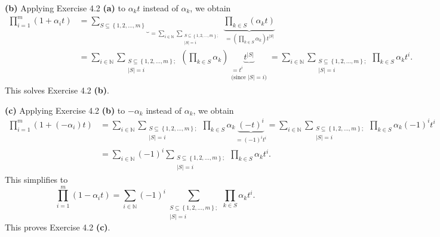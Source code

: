 \documentclass[numbers=enddot,12pt,final,onecolumn,notitlepage]{scrartcl}%
\begin{document}
\textbf{(b)} Applying Exercise 4.2 \textbf{(a)} to $\alpha_{k}t$ instead of
$\alpha_{k}$, we obtain%
\begin{align*}
\prod\limits_{i=1}^{m}\left(  1+\alpha_{i}t\right)   &  =\underbrace{\sum
\limits_{S\subseteq\left\{  1,2,...,m\right\}  }}_{=\sum\limits_{i\in
\mathbb{N}}\sum\limits_{\substack{S\subseteq\left\{  1,2,...,m\right\}
;\\\left\vert S\right\vert =i}}}\underbrace{\prod\limits_{k\in S}\left(
\alpha_{k}t\right)  }_{=\left(  \prod\limits_{k\in S}\alpha_{k}\right)
t^{\left\vert S\right\vert }}\\
&  =\sum\limits_{i\in\mathbb{N}}\sum\limits_{\substack{S\subseteq\left\{
1,2,...,m\right\}  ;\\\left\vert S\right\vert =i}}\left(  \prod\limits_{k\in
S}\alpha_{k}\right)  \underbrace{t^{\left\vert S\right\vert }}%
_{\substack{=t^{i}\\\text{(since }\left\vert S\right\vert =i\text{)}}%
}=\sum\limits_{i\in\mathbb{N}}\sum\limits_{\substack{S\subseteq\left\{
1,2,...,m\right\}  ;\\\left\vert S\right\vert =i}}\prod\limits_{k\in S}%
\alpha_{k}t^{i}.
\end{align*}
This solves Exercise 4.2 \textbf{(b)}.

\textbf{(c)} Applying Exercise 4.2 \textbf{(b)} to $-\alpha_{k}$ instead of
$\alpha_{k}$, we obtain%
\begin{align*}
\prod\limits_{i=1}^{m}\left(  1+\left(  -\alpha_{i}\right)  t\right)   &
=\sum\limits_{i\in\mathbb{N}}\sum\limits_{\substack{S\subseteq\left\{
1,2,...,m\right\}  ;\\\left\vert S\right\vert =i}}\prod\limits_{k\in S}%
\alpha_{k}\underbrace{\left(  -t\right)  ^{i}}_{=\left(  -1\right)  ^{i}t^{i}%
}=\sum\limits_{i\in\mathbb{N}}\sum\limits_{\substack{S\subseteq\left\{
1,2,...,m\right\}  ;\\\left\vert S\right\vert =i}}\prod\limits_{k\in S}%
\alpha_{k}\left(  -1\right)  ^{i}t^{i}\\
&  =\sum\limits_{i\in\mathbb{N}}\left(  -1\right)  ^{i}\sum
\limits_{\substack{S\subseteq\left\{  1,2,...,m\right\}  ;\\\left\vert
S\right\vert =i}}\prod\limits_{k\in S}\alpha_{k}t^{i}.
\end{align*}
This simplifies to%
\[
\prod\limits_{i=1}^{m}\left(  1-\alpha_{i}t\right)  =\sum\limits_{i\in
\mathbb{N}}\left(  -1\right)  ^{i}\sum\limits_{\substack{S\subseteq\left\{
1,2,...,m\right\}  ;\\\left\vert S\right\vert =i}}\prod\limits_{k\in S}%
\alpha_{k}t^{i}.
\]
This proves Exercise 4.2 \textbf{(c)}.
\end{document}
